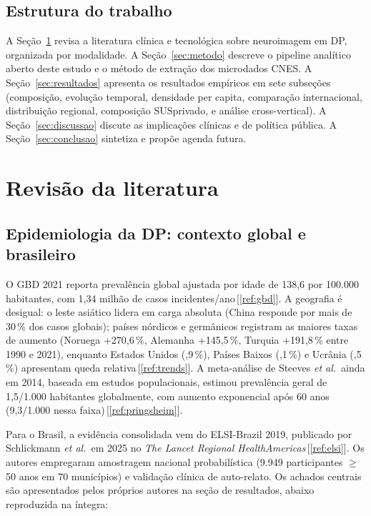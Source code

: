 \documentclass[12pt,a4paper,oneside]{article}
\begin{document}
\subsection{Estrutura do trabalho}

A Seção~\ref{sec:teoria} revisa a literatura clínica e tecnológica
sobre neuroimagem em DP, organizada por modalidade. A
Seção~\ref{sec:metodo} descreve o pipeline analítico aberto deste estudo e o método de extração dos microdados
CNES. A Seção~\ref{sec:resultados} apresenta os resultados
empíricos em sete subseções (composição, evolução temporal,
densidade per capita, comparação internacional, distribuição
regional, composição SUS\textendash privado, e análise
cross-vertical). A Seção~\ref{sec:discussao} discute as implicações
clínicas e de política pública. A Seção~\ref{sec:conclusao} sintetiza
e propõe agenda futura.

\section{Revisão da literatura}\label{sec:teoria}

\subsection{Epidemiologia da DP: contexto global e brasileiro}

O GBD 2021 reporta prevalência global ajustada por idade de 138,6
por 100.000 habitantes, com 1,34 milhão de casos
incidentes/ano\,[\ref{ref:gbd}]. A geografia é desigual: o leste
asiático lidera em carga absoluta (China responde por mais de 30\,\%
dos casos globais); países nórdicos e germânicos registram as
maiores taxas de aumento (Noruega +270,6\,\%, Alemanha +145,5\,\%,
Turquia +191,8\,\% entre 1990 e 2021), enquanto Estados Unidos
(,9\,\%), Países Baixos (,1\,\%) e Ucrânia
(,5\,\%) apresentam queda relativa\,[\ref{ref:trends}].
A meta-análise de Steeves \textit{et al.}\ ainda em 2014, baseada em
estudos populacionais, estimou prevalência geral de 1,5/1.000
habitantes globalmente, com aumento exponencial após 60 anos
(9,3/1.000 nessa faixa)\,[\ref{ref:pringsheim}].

Para o Brasil, a evidência consolidada vem do ELSI-Brazil 2019,
publicado por Schlickmann \textit{et al.}\ em 2025 no \textit{The
Lancet Regional Health\textendash Americas}\,[\ref{ref:elsi}]. Os autores
empregaram amostragem nacional probabilística (9.949 participantes
$\geq$ 50 anos em 70 municípios) e validação clínica de auto-relato.
Os achados centrais são apresentados pelos próprios autores na seção
de resultados, abaixo reproduzida na íntegra:
\end{document}
